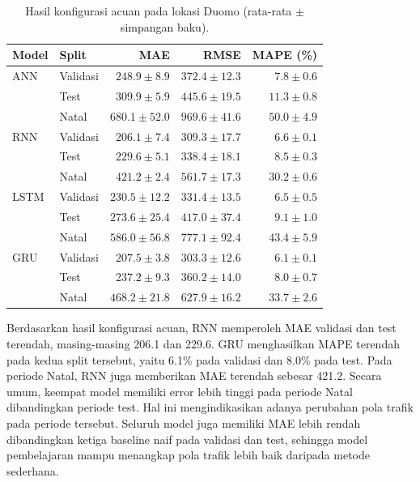 \documentclass[conference,a4paper]{IEEEtran}
\begin{document}
\begin{table}[ht]
\centering
\caption{Hasil konfigurasi acuan pada lokasi Duomo (rata-rata $\pm$ simpangan baku).}
\label{tab:acuan}
\scriptsize
\begin{tabular}{llrrr}
\hline
\textbf{Model} & \textbf{Split} & \textbf{MAE} & \textbf{RMSE} & \textbf{MAPE (\%)} \\
\hline
ANN & Validasi & $248.9 \pm 8.9$ & $372.4 \pm 12.3$ & $7.8 \pm 0.6$ \\
    & Test     & $309.9 \pm 5.9$ & $445.6 \pm 19.5$ & $11.3 \pm 0.8$ \\
    & Natal    & $680.1 \pm 52.0$ & $969.6 \pm 41.6$ & $50.0 \pm 4.9$ \\
\hline
RNN & Validasi & $206.1 \pm 7.4$ & $309.3 \pm 17.7$ & $6.6 \pm 0.1$ \\
    & Test     & $229.6 \pm 5.1$ & $338.4 \pm 18.1$ & $8.5 \pm 0.3$ \\
    & Natal    & $421.2 \pm 2.4$ & $561.7 \pm 17.3$ & $30.2 \pm 0.6$ \\
\hline
LSTM & Validasi & $230.5 \pm 12.2$ & $331.4 \pm 13.5$ & $6.5 \pm 0.5$ \\
     & Test     & $273.6 \pm 25.4$ & $417.0 \pm 37.4$ & $9.1 \pm 1.0$ \\
     & Natal    & $586.0 \pm 56.8$ & $777.1 \pm 92.4$ & $43.4 \pm 5.9$ \\
\hline
GRU & Validasi & $207.5 \pm 3.8$ & $303.3 \pm 12.6$ & $6.1 \pm 0.1$ \\
    & Test     & $237.2 \pm 9.3$ & $360.2 \pm 14.0$ & $8.0 \pm 0.7$ \\
    & Natal    & $468.2 \pm 21.8$ & $627.9 \pm 16.2$ & $33.7 \pm 2.6$ \\
\hline
\end{tabular}
\end{table}

Berdasarkan hasil konfigurasi acuan, RNN memperoleh MAE validasi dan test terendah, masing-masing 206.1 dan 229.6. GRU menghasilkan MAPE terendah pada kedua split tersebut, yaitu 6.1\% pada validasi dan 8.0\% pada test. Pada periode Natal, RNN juga memberikan MAE terendah sebesar 421.2. Secara umum, keempat model memiliki error lebih tinggi pada periode Natal dibandingkan periode test. Hal ini mengindikasikan adanya perubahan pola trafik pada periode tersebut. Seluruh model juga memiliki MAE lebih rendah dibandingkan ketiga baseline naif pada validasi dan test, sehingga model pembelajaran mampu menangkap pola trafik lebih baik daripada metode sederhana.
\end{document}

